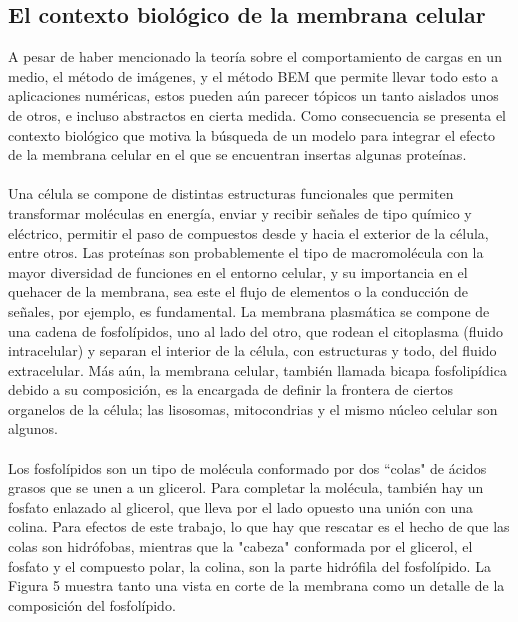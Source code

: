 \documentclass[12pt, notitlepage]{article}
\numberwithin{equation}{section}
\begin{document}
\subsection{El contexto biológico de la membrana celular}
A pesar de haber mencionado la teoría sobre el comportamiento de cargas en un medio, el método de imágenes, y el método BEM que permite llevar todo esto a aplicaciones numéricas, estos pueden aún parecer tópicos un tanto aislados unos de otros, e incluso abstractos en cierta medida. Como consecuencia se presenta el contexto biológico que motiva la búsqueda de un modelo para integrar el efecto de la membrana celular en el que se encuentran insertas algunas proteínas.\\\\
Una célula se compone de distintas estructuras funcionales que permiten transformar moléculas en energía, enviar y recibir señales de tipo químico y eléctrico, permitir el paso de compuestos desde y hacia el exterior de la célula, entre otros. Las proteínas son probablemente el tipo de macromolécula con la mayor diversidad de funciones en el entorno celular, y su importancia en el quehacer de la membrana, sea este el flujo de elementos o la conducción de señales, por ejemplo, es fundamental. La membrana plasmática se compone de una cadena de fosfolípidos, uno al lado del otro, que rodean el citoplasma (fluido intracelular) y separan el interior de la célula, con estructuras y todo, del fluido extracelular. Más aún, la membrana celular, también llamada bicapa fosfolipídica debido a su composición, es la encargada de definir la frontera de ciertos organelos de la célula; las lisosomas, mitocondrias y el mismo núcleo celular son algunos.\\\\
Los fosfolípidos son un tipo de molécula conformado por dos ``colas" de ácidos grasos que se unen a un glicerol. Para completar la molécula, también hay un fosfato enlazado al glicerol, que lleva por el lado opuesto una unión con una colina. Para efectos de este trabajo, lo que hay que rescatar es el hecho de que las colas son hidrófobas, mientras que la "cabeza" conformada por el glicerol, el fosfato y el compuesto polar, la colina, son la parte hidrófila del fosfolípido. La Figura 5 muestra tanto una vista en corte de la membrana como un detalle de la composición del fosfolípido.
%	
\end{document}
